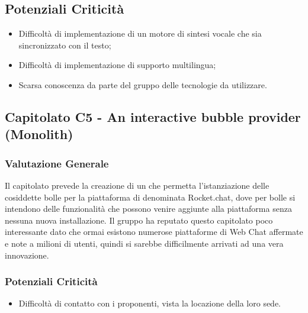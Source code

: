 \subsection{Potenziali Criticità}
 \begin{itemize}
 \item Difficoltà di implementazione di un motore di sintesi vocale che sia sincronizzato con il testo;
 \item Difficoltà di implementazione di supporto multilingua;
 \item Scarsa conoscenza da parte del gruppo delle tecnologie da utilizzare.
 \end{itemize}
    
\subsection{Capitolato C5 - An interactive bubble provider (Monolith)}
    \subsubsection{Valutazione Generale}
    Il capitolato prevede la creazione di un  che permetta l'istanziazione delle cosiddette bolle per la piattaforma di  denominata Rocket.chat, dove per bolle si intendono delle funzionalità che possono venire aggiunte alla piattaforma senza nessuna nuova installazione.
    Il gruppo ha reputato questo capitolato poco interessante dato che ormai esistono numerose piattaforme di Web Chat affermate e note a milioni di utenti, quindi si sarebbe difficilmente arrivati ad una vera innovazione.
    \subsubsection{Potenziali Criticità}
    \begin{itemize}
     \item Difficoltà di contatto con i proponenti, vista la locazione della loro sede.    
    \end{itemize}
 